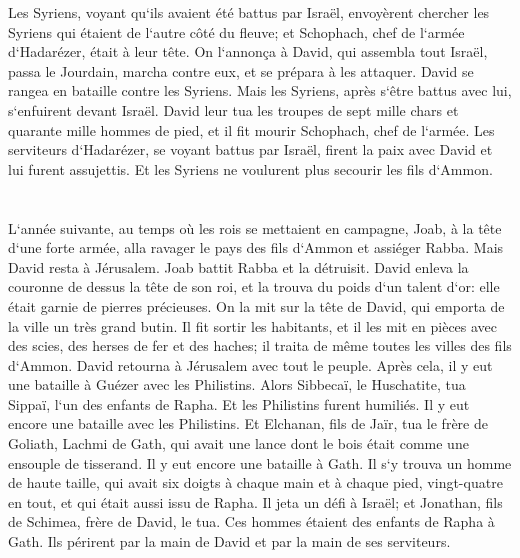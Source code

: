 \verse Les Syriens, voyant qu`ils avaient été battus par Israël, envoyèrent chercher les Syriens qui étaient de l`autre côté du fleuve; et Schophach, chef de l`armée d`Hadarézer, était à leur tête. 
\verse On l`annonça à David, qui assembla tout Israël, passa le Jourdain, marcha contre eux, et se prépara à les attaquer. David se rangea en bataille contre les Syriens. Mais les Syriens, après s`être battus avec lui, s`enfuirent devant Israël. 
\verse David leur tua les troupes de sept mille chars et quarante mille hommes de pied, et il fit mourir Schophach, chef de l`armée. 
\verse Les serviteurs d`Hadarézer, se voyant battus par Israël, firent la paix avec David et lui furent assujettis. Et les Syriens ne voulurent plus secourir les fils d`Ammon. 

\chapter{}

\verse L`année suivante, au temps où les rois se mettaient en campagne, Joab, à la tête d`une forte armée, alla ravager le pays des fils d`Ammon et assiéger Rabba. Mais David resta à Jérusalem. Joab battit Rabba et la détruisit. 
\verse David enleva la couronne de dessus la tête de son roi, et la trouva du poids d`un talent d`or: elle était garnie de pierres précieuses. On la mit sur la tête de David, qui emporta de la ville un très grand butin. 
\verse Il fit sortir les habitants, et il les mit en pièces avec des scies, des herses de fer et des haches; il traita de même toutes les villes des fils d`Ammon. David retourna à Jérusalem avec tout le peuple. 
\verse Après cela, il y eut une bataille à Guézer avec les Philistins. Alors Sibbecaï, le Huschatite, tua Sippaï, l`un des enfants de Rapha. Et les Philistins furent humiliés. 
\verse Il y eut encore une bataille avec les Philistins. Et Elchanan, fils de Jaïr, tua le frère de Goliath, Lachmi de Gath, qui avait une lance dont le bois était comme une ensouple de tisserand. 
\verse Il y eut encore une bataille à Gath. Il s`y trouva un homme de haute taille, qui avait six doigts à chaque main et à chaque pied, vingt-quatre en tout, et qui était aussi issu de Rapha. 
\verse Il jeta un défi à Israël; et Jonathan, fils de Schimea, frère de David, le tua. 
\verse Ces hommes étaient des enfants de Rapha à Gath. Ils périrent par la main de David et par la main de ses serviteurs. 

\chapter{}

